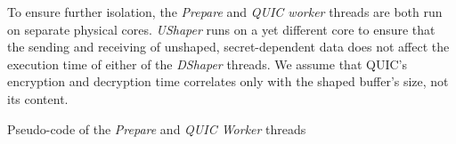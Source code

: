 To ensure further isolation, the \textit{Prepare} and \textit{QUIC worker} threads are both run on separate physical cores.
\textit{UShaper} runs on a yet different core to ensure that the sending and receiving of unshaped, secret-dependent data does not affect the execution time of either of the \textit{DShaper} threads.
We assume that QUIC's encryption and decryption time correlates only with the shaped buffer's size, not its content.



\begin{minipage}{\textwidth}

\captionsetup{type=lstlisting}
\caption{Pseudo-code of the \textit{Prepare} and \textit{QUIC Worker} threads}
\label{lst:prepare_and_worker}
\end{minipage}

